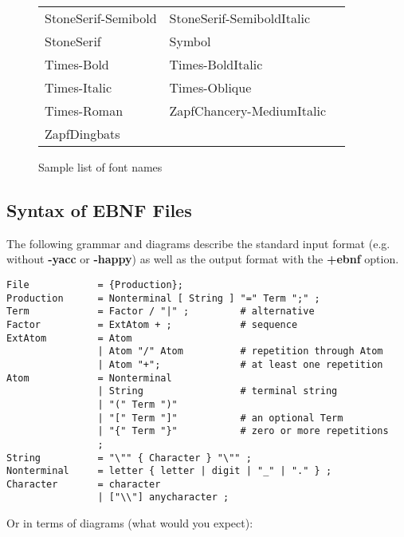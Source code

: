 \documentclass{article}
\begin{document}
\begin{figure}
\begin{center}
\begin{tabular}{|l|l|l|}
        StoneSerif-Semibold & StoneSerif-SemiboldItalic \\
        StoneSerif & Symbol \\
        Times-Bold & Times-BoldItalic \\
        Times-Italic & Times-Oblique \\
        Times-Roman & ZapfChancery-MediumItalic \\
        ZapfDingbats & \\ \hline
    \end{tabular}
  \end{center}
  \caption{Sample list of font names}
  \label{fig:AFMfonts}
\end{figure}


\subsection{Syntax of EBNF Files}
\label{sec:syntax}

The following grammar and diagrams describe the standard input format (e.g. without
\textbf{-yacc} or \textbf{-happy}) as well as the output format with the \textbf{+ebnf}
option.

\begin{verbatim}
File            = {Production};
Production      = Nonterminal [ String ] "=" Term ";" ;
Term            = Factor / "|" ;         # alternative
Factor          = ExtAtom + ;            # sequence
ExtAtom         = Atom
                | Atom "/" Atom          # repetition through Atom
                | Atom "+";              # at least one repetition
Atom            = Nonterminal
                | String                 # terminal string
                | "(" Term ")"
                | "[" Term "]"           # an optional Term
                | "{" Term "}"           # zero or more repetitions
                ;
String          = "\"" { Character } "\"" ;
Nonterminal     = letter { letter | digit | "_" | "." } ;
Character       = character
                | ["\\"] anycharacter ;
\end{verbatim}

Or in terms of diagrams (what would you expect):
\begin{flushleft}
  \leavevmode{}
  \\
  \leavevmode{}
  \\
  \leavevmode{}
  \\
  \leavevmode{}
  \\
  \leavevmode{}
  \\
  \leavevmode{}
  \\
  \leavevmode{}
  \\
  \leavevmode{}
  \\
  \leavevmode{}
\end{flushleft}
\end{document}
